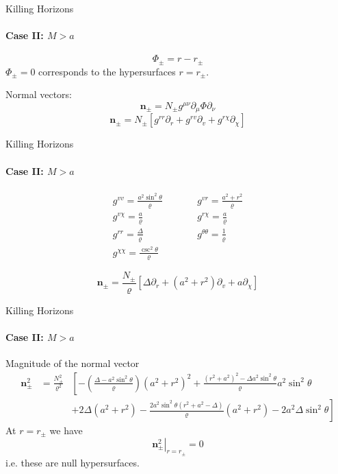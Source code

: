 \documentclass{beamer}
\begin{document}
        \begin{frame}{Killing Horizons}
         \framesubtitle{Case II: $M>a$}
            $$\Phi_{\pm}=r-r_{\pm}$$
            \pause
            $\Phi_{\pm}=0$ corresponds to the hypersurfaces $r=r_{\pm}$. 
            \pause
            \bigskip
            
            Normal vectors:
			$$\mathbf{n}_{\pm} =  N_{\pm}g^{\mu\nu}\partial_{\mu}\Phi\partial_{\nu}$$
            \pause
            $$\mathbf{n}_{\pm} = N_{\pm} \left[g^{rr}\partial_{r}+g^{rv}\partial_{v}+g^{r\chi}\partial_{\chi}\right]$$
        \end{frame}
        
        \begin{frame}{Killing Horizons}
         \framesubtitle{Case II: $M>a$}
            \begin{equation*}
            \begin{array}{lcl}
            g^{vv}=\frac{a^{2}\sin^{2}\theta}{\varrho} & \qquad & g^{vr}=\frac{a^{2}+r^{2}}{\varrho}\\
            g^{v\chi}=\frac{a}{\varrho} & \qquad & g^{r\chi}=\frac{a}{\varrho}\\
            g^{rr}=\frac{\Delta}{\varrho} & \qquad & g^{\theta\theta}=\frac{1}{\varrho}\\
            g^{\chi\chi}=\frac{\csc^{2}\theta}{\varrho} & \qquad
            \end{array}
            \end{equation*}
            \pause

            $$ \mathbf{n}_{\pm} = \frac{N_{\pm}}{\varrho}\left[\Delta\partial_{r}+\left(a^{2}+r^{2}\right)\partial_{v}+a\partial_{\chi}\right]$$        
        \end{frame}
        
        \begin{frame}{Killing Horizons}
         \framesubtitle{Case II: $M>a$}
        	Magnitude of the normal vector
            \footnotesize
            \begin{eqnarray*}
\mathbf{n}_{\pm}^{2} & =\frac{N_{\pm}^{2}}{\varrho^{2}} & \left[-\left(\frac{\Delta-a^{2}\sin^{2}\theta}{\varrho}\right)\left(a^{2}+r^{2}\right)^{2}+\frac{\left(r^{2}+a^{2}\right)^{2}-\Delta a^{2}\sin^{2}\theta}{\varrho}a^{2}\sin^{2}\theta\right.\nonumber \\
 &  & \left.+2\Delta\left(a^{2}+r^{2}\right)-\frac{2a^{2}\sin^{2}\theta\left(r^{2}+a^{2}-\Delta\right)}{\varrho}\left(a^{2}+r^{2}\right)-2a^{2}\Delta\sin^{2}\theta\right]
			\end{eqnarray*}
            \pause
            \normalsize
            At $r=r_{\pm}$ we have
            $$\left.\mathbf{n}_{\pm}^{2}\right|_{r=r_{\pm}}=0$$
            \pause
            i.e. these are null hypersurfaces.
       	\end{frame}
 
\end{document}
